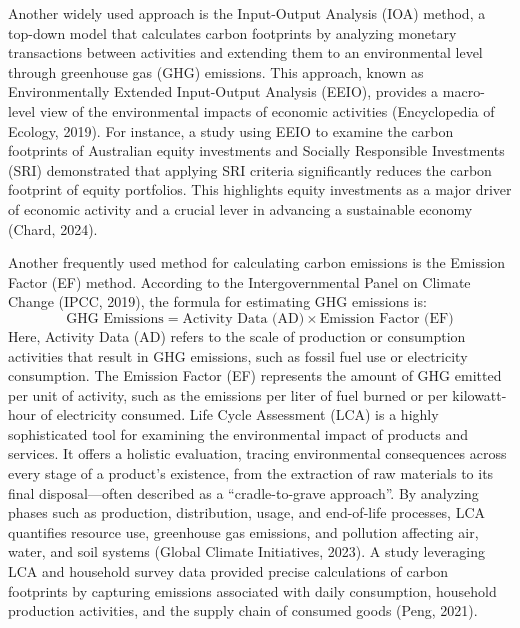\documentclass[12pt,a4paper]{article}%
\begin{document}
Another widely used approach is the Input-Output Analysis (IOA) method, a top-down model that calculates carbon footprints by analyzing monetary transactions between activities and extending them to an environmental level through greenhouse gas (GHG) emissions. This approach, known as Environmentally Extended Input-Output Analysis (EEIO), provides a macro-level view of the environmental impacts of economic activities (Encyclopedia of Ecology, 2019). For instance, a study using EEIO to examine the carbon footprints of Australian equity investments and Socially Responsible Investments (SRI) demonstrated that applying SRI criteria significantly reduces the carbon footprint of equity portfolios. This highlights equity investments as a major driver of economic activity and a crucial lever in advancing a sustainable economy (Chard, 2024).
\vspace{5pt}

Another frequently used method for calculating carbon emissions is the Emission Factor (EF) method. According to the Intergovernmental Panel on Climate Change (IPCC, 2019), the formula for estimating GHG emissions is:
\[
\text{GHG Emissions} = \text{Activity Data (AD)} \times \text{Emission Factor (EF)}
\]
Here, Activity Data (AD) refers to the scale of production or consumption activities that result in GHG emissions, such as fossil fuel use or electricity consumption. The Emission Factor (EF) represents the amount of GHG emitted per unit of activity, such as the emissions per liter of fuel burned or per kilowatt-hour of electricity consumed. Life Cycle Assessment (LCA) is a highly sophisticated tool for examining the environmental impact of products and services. It offers a holistic evaluation, tracing environmental consequences across every stage of a product's existence, from the extraction of raw materials to its final disposal—often described as a ``cradle-to-grave approach''. By analyzing phases such as production, distribution, usage, and end-of-life processes, LCA quantifies resource use, greenhouse gas emissions, and pollution affecting air, water, and soil systems (Global Climate Initiatives, 2023). A study leveraging LCA and household survey data provided precise calculations of carbon footprints by capturing emissions associated with daily consumption, household production activities, and the supply chain of consumed goods (Peng, 2021).

\vspace{5pt}
\end{document}
